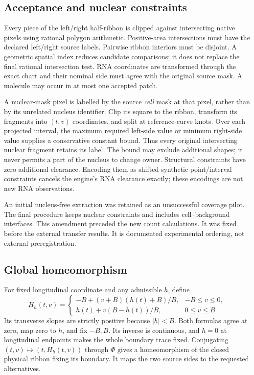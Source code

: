 \documentclass[10pt,letterpaper]{article}
\begin{document}
\subsection{Acceptance and nuclear constraints}
Every piece of the left/right half-ribbon is clipped against intersecting native pixels using rational polygon arithmetic. Positive-area intersections must have the declared left/right source labels. Pairwise ribbon interiors must be disjoint. A geometric spatial index reduces candidate comparisons; it does not replace the final rational intersection test. RNA coordinates are transformed through the exact chart and their nominal side must agree with the original source mask. A molecule may occur in at most one accepted patch.

A nuclear-mask pixel is labelled by the source \emph{cell} mask at that pixel, rather than by its unrelated nucleus identifier. Clip its square to the ribbon, transform its fragments into $(t,v)$ coordinates, and split at reference-curve knots. Over each projected interval, the maximum required left-side value or minimum right-side value supplies a conservative constant bound. Thus every original intersecting nuclear fragment retains its label. The bound may exclude additional shapes; it never permits a part of the nucleus to change owner. Structural constraints have zero additional clearance. Encoding them as shifted synthetic point/interval constraints cancels the engine's RNA clearance exactly; these encodings are not new RNA observations.

An initial nucleus-free extraction was retained as an unsuccessful coverage pilot. The final procedure keeps nuclear constraints and includes cell--background interfaces. This amendment preceded the new count calculations. It was fixed before the external transfer results. It is documented experimental ordering, not external preregistration.

\subsection{Global homeomorphism}
For fixed longitudinal coordinate and any admissible $h$, define
\[
 H_h(t,v)=\begin{cases}
 -B+(v+B)(h(t)+B)/B,&-B\le v\le0,\\
 h(t)+v(B-h(t))/B,&0\le v\le B.
 \end{cases}
\]
Its transverse slopes are strictly positive because $|h|<B$. Both formulas agree at zero, map zero to $h$, and fix $-B,B$. Its inverse is continuous, and $h=0$ at longitudinal endpoints makes the whole boundary trace fixed. Conjugating $(t,v)\mapsto(t,H_h(t,v))$ through $\Phi$ gives a homeomorphism of the closed physical ribbon fixing its boundary. It maps the two source sides to the requested alternatives.
\end{document}
